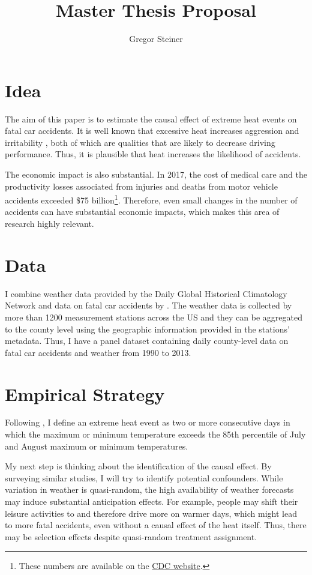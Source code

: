 \documentclass[11pt]{article}
\author{Gregor Steiner}
\title{Master Thesis Proposal}
\begin{document}
\maketitle

\section*{Idea}

The aim of this paper is to estimate the causal effect of extreme heat events on fatal car accidents. It is well known that excessive heat increases aggression and irritability \citep{anderson2011implications}, both of which are qualities that are likely to decrease driving performance. Thus, it is plausible that heat increases the likelihood of accidents.

The economic impact is also substantial. In 2017, the cost of medical care and the productivity losses associated from injuries and deaths from motor vehicle accidents exceeded \$75 billion\footnote{These numbers are available on the \href{https://www.cdc.gov/transportationsafety/costs/index.html}{CDC website}.}. Therefore, even small changes in the number of accidents can have substantial economic impacts, which makes this area of research highly relevant.

\section*{Data}

I combine weather data provided by the Daily Global Historical Climatology Network \citep{Menne_2012} and data on fatal car accidents by \citet{Smith_2016}. The weather data is collected by more than 1200 measurement stations across the US and they can be aggregated to the county level using the geographic information provided in the stations' metadata. Thus, I have a panel dataset containing daily county-level data on fatal car accidents and weather from 1990 to 2013.

\section*{Empirical Strategy}

Following \citet{Habeeb_2015}, I define an extreme heat event as two or more
consecutive days in which the maximum or minimum temperature exceeds the 85th percentile of July and August maximum or minimum temperatures. 

My next step is thinking about the identification of the causal effect. By surveying similar studies, I will try to identify potential confounders. While variation in weather is quasi-random, the high availability of weather forecasts may induce substantial anticipation effects. For example, people may shift their leisure activities to and therefore drive more on warmer days, which might lead to more fatal accidents, even without a causal effect of the heat itself. Thus, there may be selection effects despite quasi-random treatment assignment.
\end{document}
